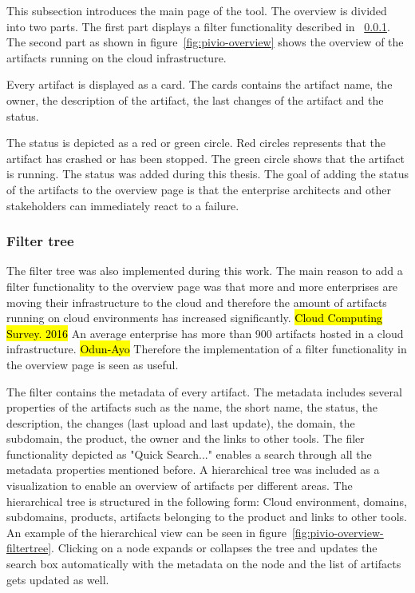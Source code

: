 This subsection introduces the main page of the tool. The overview is divided into two parts. The first part displays a filter functionality described in ~\ref{subsubsection:filtertree}. The second part as shown in figure~\ref{fig:pivio-overview} shows the overview of the artifacts running on the cloud infrastructure.

Every artifact is displayed as a card. The cards contains the artifact name, the owner, the description of the artifact, the last changes of the artifact and the status. 
 
The status is depicted as a red or green circle. Red circles represents that the artifact has crashed or has been stopped. The green circle shows that the artifact is running. The status was added during this thesis. The goal of adding the status of the artifacts to the overview page is that the enterprise architects and other stakeholders can immediately react to a failure.

\subsubsection{Filter tree}\label{subsubsection:filtertree}

The filter tree was also implemented during this work. The main reason to add a filter functionality to the overview page was that more and more enterprises are moving their infrastructure to the cloud and therefore the amount of artifacts running on cloud environments has increased significantly.\hl{ Cloud Computing Survey. 2016}
An average enterprise has more than 900 artifacts hosted in a cloud infrastructure. \hl{Odun-Ayo} Therefore the implementation of a filter functionality in the overview page is seen as useful.

The filter contains the metadata of every artifact. The metadata includes several properties of the artifacts such as the name, the short name, the status, the description, the changes (last upload and last update), the domain, the subdomain, the product, the owner and the links to other tools. The filer functionality depicted as "Quick Search..." enables a search through all the metadata properties mentioned before.
A hierarchical tree was included as a visualization to enable an overview of artifacts per different areas. The hierarchical tree is structured in the following form: Cloud environment, domains, subdomains, products, artifacts belonging to the product and links to other tools. An example of the hierarchical view can be seen in figure~\ref{fig:pivio-overview-filtertree}. Clicking on a node expands or collapses the tree and updates the search box automatically with the metadata on the node and the list of artifacts gets updated as well.

